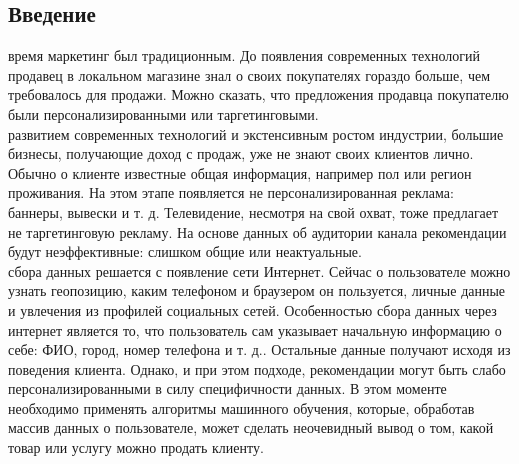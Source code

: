 \documentclass{article}
\newcommand\tab[1][1cm]{\hspace*{#1}}
\begin{document}
\newpage
	
\renewcommand*\contentsname{Содержание}
\makeatletter
\renewcommand{\l@section}{\@dottedtocline{1}{0em}{2em}}
\renewcommand{\l@subsection}{\@dottedtocline{1}{0em}{2.6em}}
\renewcommand{\l@subsubsection}{\@dottedtocline{1}{0em}{3.2em}}

\makeatother
\setcounter{page}{2}

\begin{center}
	\tableofcontents
\end{center}

\newpage
{}
\begin{center}
	\section*{Введение\vspace{5mm}}
\end{center}
 время маркетинг был традиционным. До появления современных технологий продавец в локальном магазине знал о своих покупателях гораздо больше, чем требовалось для продажи. Можно сказать, что предложения продавца покупателю были персонализированными или таргетинговыми. \\
 развитием современных технологий и экстенсивным ростом индустрии, большие бизнесы, получающие доход с продаж, уже не знают своих клиентов лично. Обычно о клиенте известные общая информация, например пол или регион проживания. На этом этапе появляется не персонализированная реклама: баннеры, вывески и т. д. Телевидение, несмотря на свой охват, тоже предлагает не таргетинговую рекламу. На основе данных об аудитории канала рекомендации будут неэффективные: слишком общие или неактуальные. \\
 сбора данных решается с появление сети Интернет. Сейчас о пользователе можно узнать геопозицию, каким телефоном и браузером он пользуется, личные данные и увлечения из профилей социальных сетей. Особенностью сбора данных через интернет является то, что пользователь сам указывает начальную информацию о себе: ФИО, город, номер телефона и т. д.. Остальные данные получают исходя из поведения клиента. 
Однако, и при этом подходе, рекомендации могут быть слабо персонализированными в силу специфичности данных. В этом моменте необходимо применять алгоритмы машинного обучения, которые, обработав массив данных о пользователе, может сделать неочевидный вывод о том, какой товар или услугу можно продать клиенту.\\
\end{document}
